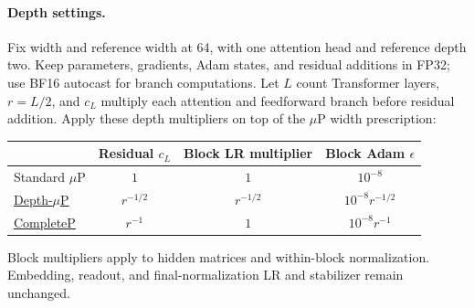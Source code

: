 \paragraph{Depth settings.}
Fix width and reference width at 64, with one attention head and reference
depth two. Keep parameters, gradients, Adam states, and residual additions
in FP32; use BF16 autocast for branch computations.
Let $L$ count Transformer layers, $r=L/2$, and $c_L$ multiply each attention
and feedforward branch before residual addition. Apply these depth multipliers
on top of the $\mu$P width prescription:
\begin{center}
\begin{tabular}{lccc}
\toprule
 & Residual $c_L$ & Block LR multiplier & Block Adam $\epsilon$ \\
\midrule
Standard $\mu$P & $1$ & $1$ & $10^{-8}$ \\
\href{https://arxiv.org/abs/2310.02244}{Depth-$\mu$P} & $r^{-1/2}$ & $r^{-1/2}$ & $10^{-8}r^{-1/2}$ \\
\href{https://arxiv.org/abs/2505.01618}{CompleteP} & $r^{-1}$ & $1$ & $10^{-8}r^{-1}$ \\
\bottomrule
\end{tabular}
\end{center}
Block multipliers apply to hidden matrices and within-block normalization.
Embedding, readout, and final-normalization LR and stabilizer remain unchanged.

